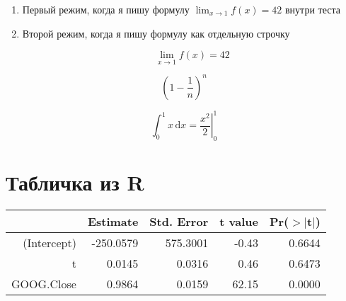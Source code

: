 \documentclass[12pt, a4paper]{article}
\newcommand{\dx}[1]{\,\mathrm{d}#1} %
\begin{document}
\vspace{2cm} 

\begin{enumerate}
    \item Первый режим, когда я пишу формулу $\displaystyle \lim_{x\to 1} f(x) = 42$ внутри теста 
    
    \item Второй режим, когда я пишу формулу как отдельную строчку 
    
    $$
    \textstyle \lim_{x\to 1} f(x) = 42
    $$
\end{enumerate}

\vspace{2cm} 

\[
\left( 1 - \frac{1}{n} \right)^n
\]

\begin{equation*}
\int_0^1 x \dx{x} = \left.\frac{x^2}{2} \right|_0^1 
\end{equation*}

\section{Табличка из R}

\begin{table}[ht]
\centering
\begin{tabular}{rrrrr}
  \hline
 & Estimate & Std. Error & t value & Pr($>$$|$t$|$) \\ 
  \hline
(Intercept) & -250.0579 & 575.3001 & -0.43 & 0.6644 \\ 
  t & 0.0145 & 0.0316 & 0.46 & 0.6473 \\ 
  GOOG.Close & 0.9864 & 0.0159 & 62.15 & 0.0000 \\ 
   \hline
\end{tabular}
\end{table}
\end{document}
